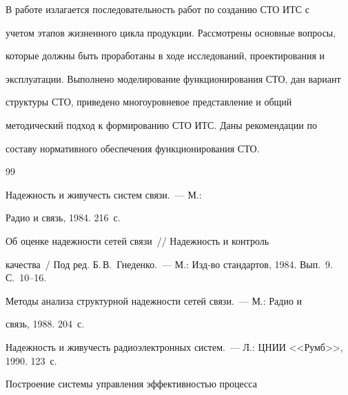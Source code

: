   В работе излагается последовательность работ по созданию СТО ИТС с 


учетом этапов жизненного цикла продукции. Рассмотрены основные вопросы, 


которые должны быть проработаны в ходе исследований, проектирования и 


эксплуатации. Выполнено моделирование функционирования СТО, дан вариант 


структуры СТО, приведено многоуровневое представление и общий 


методический подход к формированию СТО ИТС. Даны рекомендации по 


составу нормативного обеспечения функционирования СТО. 





 {\small\frenchspacing


{%




\begin{thebibliography}{99}







 Надежность и живучесть систем связи.~--- М.: 


Радио и связь, 1984. 216~с.







 Об оценке надежности сетей связи~/\!\!/ Надежность и контроль 


качества~/ Под ред. Б.\,В.~Гнеденко.~--- М.: Изд-во стандартов, 1984. Вып.~9. С.~10--16.







 Методы анализа структурной надежности сетей связи.~--- М.: Радио и 


связь, 1988. 204~с.




Надежность и живучесть радиоэлектронных систем.~--- Л.: ЦНИИ <<Румб>>, 1990. 123~с.







 Построение системы управления эффективностью процесса 



\end{thebibliography}}}
